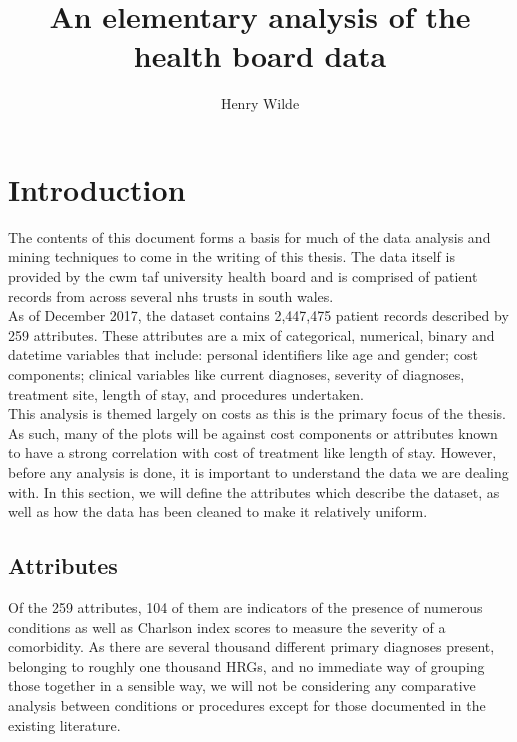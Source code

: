 \documentclass{article}
\title{An elementary analysis of the health board data}
\author{Henry Wilde}
\begin{document}
\maketitle




\section{Introduction}\label{sec:intro}

The contents of this document forms a basis for much of the data analysis and
mining techniques to come in the writing of this thesis. The data itself is
provided by the cwm taf university health board and is comprised of patient
records from across several nhs trusts in south wales.\\

As of December 2017, the dataset contains 2,447,475 patient records described by
259 attributes. These attributes are a mix of categorical, numerical, binary and
datetime variables that include: personal identifiers like age and gender; cost
components; clinical variables like current diagnoses, severity of diagnoses,
treatment site, length of stay, and procedures undertaken.\\

This analysis is themed largely on costs as this is the primary focus of the
thesis. As such, many of the plots will be against cost components or attributes
known to have a strong correlation with cost of treatment like length of stay.
However, before any analysis is done, it is important to understand the data we
are dealing with. In this section, we will define the attributes which describe
the dataset, as well as how the data has been cleaned to make it relatively
uniform. 


\subsection{Attributes}\label{subsec:attributes}

Of the 259 attributes, 104 of them are indicators of the presence of numerous
conditions as well as Charlson index scores to measure the severity of a
comorbidity. As there are several thousand different primary diagnoses present, 
belonging to roughly one thousand HRGs, and no immediate way of grouping those
together in a sensible way, we will not be considering any comparative analysis
between conditions or procedures except for those documented in the existing
literature.\\
\end{document}
